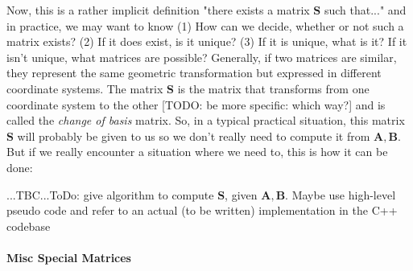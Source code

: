 \medskip
Now, this is a rather implicit definition "there exists a matrix $\mathbf{S}$ such that..." and in practice, we may want to know (1) How can we decide, whether or not such a matrix exists? (2) If it does exist, is it unique? (3) If it is unique, what is it? If it isn't unique, what matrices are possible? Generally, if two matrices are similar, they represent the same geometric transformation but expressed in different coordinate systems. The matrix $\mathbf{S}$ is the matrix that transforms from one coordinate system to the other [TODO: be more specific: which way?] and is called the \emph{change of basis} matrix. So, in a typical practical situation, this matrix $\mathbf{S}$ will probably be given to us so we don't really need to compute it from $\mathbf{A,B}$. But if we really encounter a situation where we need to, this is how it can be done:

...TBC...ToDo: give algorithm to compute $\mathbf{S}$, given $\mathbf{A,B}$. Maybe use high-level pseudo code and refer to an actual (to be written) implementation in the C++ codebase 







\paragraph{Misc Special Matrices}


